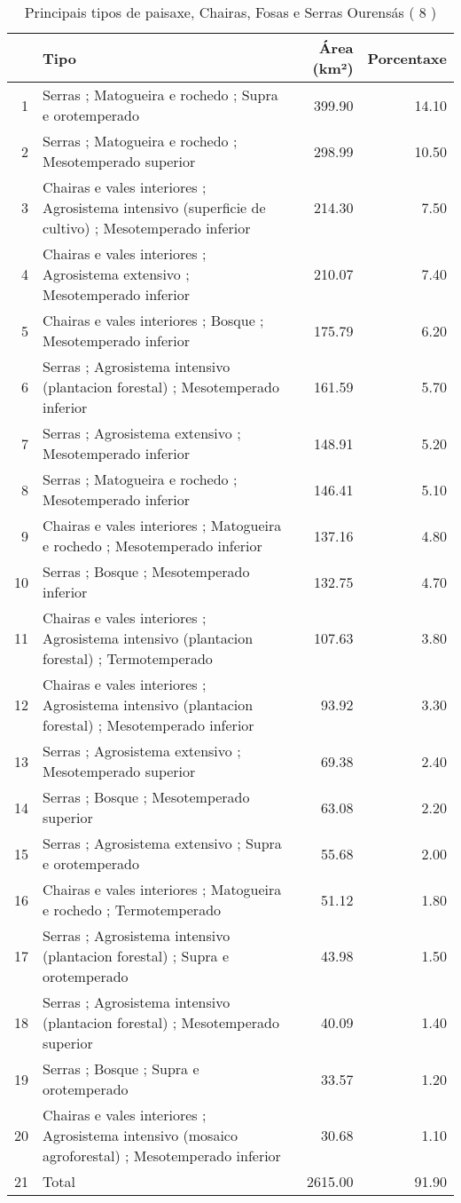 \begin{table}[p]
\centering
\caption{Principais tipos de paisaxe,  Chairas, Fosas e Serras Ourensás ( 8 )} 
\label{Tipos 8}
\begin{tabular}{rlrr}
  \hline
 & Tipo & Área (km²) & Porcentaxe \\ 
  \hline
1 & Serras ; Matogueira e rochedo ; Supra e orotemperado & 399.90 & 14.10 \\ 
  2 & Serras ; Matogueira e rochedo ; Mesotemperado superior & 298.99 & 10.50 \\ 
  3 & Chairas e vales interiores ; Agrosistema intensivo (superficie de cultivo) ; Mesotemperado inferior & 214.30 & 7.50 \\ 
  4 & Chairas e vales interiores ; Agrosistema extensivo ; Mesotemperado inferior & 210.07 & 7.40 \\ 
  5 & Chairas e vales interiores ; Bosque ; Mesotemperado inferior & 175.79 & 6.20 \\ 
  6 & Serras ; Agrosistema intensivo (plantacion forestal) ; Mesotemperado inferior & 161.59 & 5.70 \\ 
  7 & Serras ; Agrosistema extensivo ; Mesotemperado inferior & 148.91 & 5.20 \\ 
  8 & Serras ; Matogueira e rochedo ; Mesotemperado inferior & 146.41 & 5.10 \\ 
  9 & Chairas e vales interiores ; Matogueira e rochedo ; Mesotemperado inferior & 137.16 & 4.80 \\ 
  10 & Serras ; Bosque ; Mesotemperado inferior & 132.75 & 4.70 \\ 
  11 & Chairas e vales interiores ; Agrosistema intensivo (plantacion forestal) ; Termotemperado & 107.63 & 3.80 \\ 
  12 & Chairas e vales interiores ; Agrosistema intensivo (plantacion forestal) ; Mesotemperado inferior & 93.92 & 3.30 \\ 
  13 & Serras ; Agrosistema extensivo ; Mesotemperado superior & 69.38 & 2.40 \\ 
  14 & Serras ; Bosque ; Mesotemperado superior & 63.08 & 2.20 \\ 
  15 & Serras ; Agrosistema extensivo ; Supra e orotemperado & 55.68 & 2.00 \\ 
  16 & Chairas e vales interiores ; Matogueira e rochedo ; Termotemperado & 51.12 & 1.80 \\ 
  17 & Serras ; Agrosistema intensivo (plantacion forestal) ; Supra e orotemperado & 43.98 & 1.50 \\ 
  18 & Serras ; Agrosistema intensivo (plantacion forestal) ; Mesotemperado superior & 40.09 & 1.40 \\ 
  19 & Serras ; Bosque ; Supra e orotemperado & 33.57 & 1.20 \\ 
  20 & Chairas e vales interiores ; Agrosistema intensivo (mosaico agroforestal) ; Mesotemperado inferior & 30.68 & 1.10 \\ 
  21 & Total & 2615.00 & 91.90 \\ 
   \hline
\end{tabular}
\end{table}
